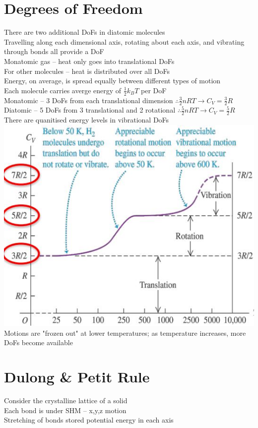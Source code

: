\documentclass[a4paper, 11pt, fleqn, normalem]{report}
\begin{document}
\section{Degrees of Freedom}
There are two additional DoFs in diatomic molecules \\
Travelling along each dimensional axis, rotating about each axis, and vibrating through bonds all provide a DoF \\
Monatomic gas -- heat only goes into translational DoFs \\
For other molecules -- heat is distributed over all DoFs \\
Energy, on average, is spread equally between different types of motion \\
Each molecule carries averge energy of $\frac{1}{2}k_{B}T$ per DoF \\
Monatomic -- 3 DoFs from each translational dimension $\therefore \frac{3}{2}nRT \rightarrow C_{V} = \frac{3}{2}R$ \\
Diatomic -- 5 DoFs from 3 translational and 2 rotational $\therefore \frac{5}{2}nRT \rightarrow C_{V} = \frac{5}{2}R$ \\
There are quanitised energy levels in vibrational DoFs \\
\includegraphics[scale=0.8]{Vibration.jpg} \\
Motions are "frozen out" at lower temperatures; as temperature increases, more DoFs become available

\section{Dulong \& Petit Rule}
Consider the crystalline lattice of a solid \\
Each bond is under SHM -- x,y,z motion \\
Stretching of bonds stored potential energy in each axis
\end{document}
